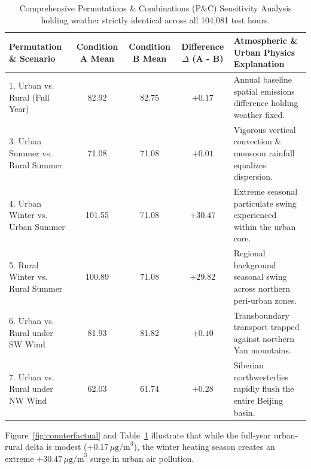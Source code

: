 \documentclass[a4paper,12pt,twocolumn]{article}
\begin{document}
\begin{table}[t]
\centering
\small
\caption{Comprehensive Permutations \& Combinations (P\&C) Sensitivity Analysis holding weather strictly identical across all 104,081 test hours.}
\label{tab:counterfactual}
\begin{tabularx}{\textwidth}{@{}l c c c X@{}}
\toprule
Permutation \& Scenario & Condition A Mean & Condition B Mean & Difference $\Delta$ (A - B) & Atmospheric \& Urban Physics Explanation \\
\midrule
1. Urban vs. Rural (Full Year) & 82.92 & 82.75 & $+0.17$ & Annual baseline spatial emissions difference holding weather fixed. \\
3. Urban Summer vs. Rural Summer & 71.08 & 71.08 & $+0.01$ & Vigorous vertical convection \& monsoon rainfall equalizes dispersion. \\
4. Urban Winter vs. Urban Summer & 101.55 & 71.08 & $+30.47$ & Extreme seasonal particulate swing experienced within the urban core. \\
5. Rural Winter vs. Rural Summer & 100.89 & 71.08 & $+29.82$ & Regional background seasonal swing across northern peri-urban zones. \\
6. Urban vs. Rural under SW Wind & 81.93 & 81.82 & $+0.10$ & Transboundary transport trapped against northern Yan mountains. \\
7. Urban vs. Rural under NW Wind & 62.03 & 61.74 & $+0.28$ & Siberian northwesterlies rapidly flush the entire Beijing basin. \\
\bottomrule
\end{tabularx}
\end{table}

Figure~\ref{fig:counterfactual} and Table~\ref{tab:counterfactual} illustrate that while the full-year urban-rural delta is modest ($+0.17\,\mu\text{g/m}^3$), the winter heating season creates an extreme $+30.47\,\mu\text{g/m}^3$ surge in urban air pollution.
\end{document}
